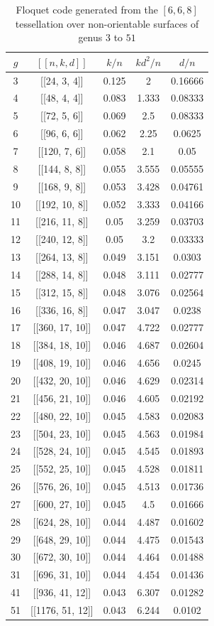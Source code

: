 \documentclass[%
reprint,
amsmath,amssymb,
aps,
]{revtex4-2}
\begin{document}
\begin{table}[b]
	\caption{\label{668}
Floquet code generated from the $[6,6,8]$ tessellation over non-orientable surfaces of genus $3$ to $51$}
	\begin{ruledtabular}
		\begin{tabular}{|c|c|c|c|c|}
	$g$ & $[[n,k,d]]$ & $k/n$ & $kd^2/n$ & $d/n$ \\ \hline
	3 & [[24,	3,	4]] &	0.125 &	2 &	0.16666  \\
	4 & [[48,	4,	4]] &	0.083 &	1.333 &	0.08333  \\
	5 & [[72,	5,	6]] &	0.069 &	2.5 &	0.08333  \\
	6 & [[96,	6,	6]] & 	0.062 &	2.25 &	0.0625  \\
	7 & [[120,	7,	6]] &	0.058 &	2.1 &	0.05  \\
	8 & [[144,	8,	8]] &	0.055 &	3.555 &	0.05555 \\
	9 & [[168,	9,	8]] &	0.053 &	3.428 &	0.04761  \\
	10 & [[192,	10,	8]] &	0.052 &	3.333 &	0.04166  \\
	11 & [[216,	11,	8]] &	0.05 &	3.259 &	0.03703  \\
	12 & [[240,	12,	8]] &	0.05 &	3.2 &	0.03333  \\
	13 & [[264,	13,	8]] &	0.049 &	3.151 &	0.0303  \\
	14 & [[288,	14,	8]] &	0.048 &	3.111 &	0.02777 \\
	15 & [[312,	15,	8]] &	0.048 &	3.076 &	0.02564  \\
	16 & [[336,	16,	8]] &	0.047 &	3.047 &	0.0238  \\
	17 & [[360,	17,	10]] &	0.047 &	4.722 &	0.02777 \\
	18 & [[384,	18,	10]] &	0.046 &	4.687 &	0.02604  \\
	19 & [[408,	19,	10]] &	0.046 &	4.656 &	0.0245  \\
	20 & [[432,	20,	10]] &	0.046 &	4.629 &	0.02314 \\
	21 & [[456,	21,	10]] &	0.046 &	4.605 &	0.02192  \\
	22 & [[480,	22,	10]] &	0.045 &	4.583 &	0.02083  \\
	23 & [[504,	23,	10]] &	0.045 &	4.563 &	0.01984  \\
	24 & [[528,	24,	10]] &	0.045 &	4.545 &	0.01893  \\
	25 & [[552,	25,	10]] &	0.045 &	4.528 &	0.01811  \\
	26 & [[576,	26,	10]] &	0.045 &	4.513 &	0.01736  \\
	27 & [[600,	27,	10]] &	0.045 &	4.5 &	0.01666 \\
	28 & [[624,	28,	10]] &	0.044 &	4.487 &	0.01602  \\
	29 & [[648,	29,	10]] &	0.044 &	4.475 &	0.01543  \\
	30 & [[672,	30,	10]] &	0.044 &	4.464 &	0.01488  \\
	31 & [[696,	31,	10]] &	0.044 &	4.454 &	0.01436  \\
	41 & [[936,	41,	12]] & 	0.043 &	6.307 &	0.01282  \\
	51 & [[1176, 51, 12]] &	0.043 &	6.244 &	0.0102  
					\end{tabular}
\end{ruledtabular}
\end{table}
\end{document}
